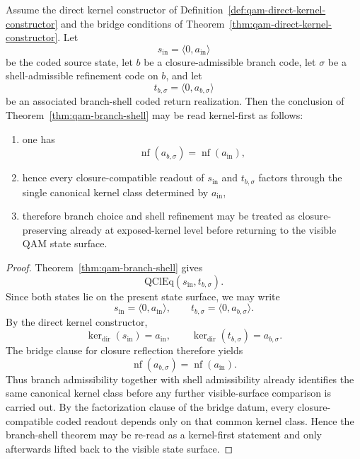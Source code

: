 \begin{proposition}\label{prop:qam-kernel-first-branch-shell}
Assume the direct kernel constructor of Definition~\ref{def:qam-direct-kernel-constructor} and the bridge conditions of Theorem~\ref{thm:qam-direct-kernel-constructor}. Let
\[
s_{\mathrm{in}}=\langle 0,a_{\mathrm{in}}\rangle
\]
be the coded source state, let $b$ be a closure-admissible branch code, let $\sigma$ be a shell-admissible refinement code on $b$, and let
\[
t_{b,\sigma}=\langle 0,a_{b,\sigma}\rangle
\]
be an associated branch-shell coded return realization. Then the conclusion of Theorem~\ref{thm:qam-branch-shell} may be read kernel-first as follows:
\begin{enumerate}
\item one has
\[
\operatorname{nf}(a_{b,\sigma})=\operatorname{nf}(a_{\mathrm{in}}),
\]
\item hence every closure-compatible readout of $s_{\mathrm{in}}$ and $t_{b,\sigma}$ factors through the single canonical kernel class determined by $a_{\mathrm{in}}$,
\item therefore branch choice and shell refinement may be treated as closure-preserving already at exposed-kernel level before returning to the visible QAM state surface.
\end{enumerate}
\end{proposition}

\begin{proof}
Theorem~\ref{thm:qam-branch-shell} gives
\[
\mathrm{QClEq}(s_{\mathrm{in}},t_{b,\sigma}).
\]
Since both states lie on the present state surface, we may write
\[
s_{\mathrm{in}}=\langle 0,a_{\mathrm{in}}\rangle,
\qquad
 t_{b,\sigma}=\langle 0,a_{b,\sigma}\rangle.
\]
By the direct kernel constructor,
\[
\operatorname{ker}_{\mathrm{dir}}(s_{\mathrm{in}})=a_{\mathrm{in}},
\qquad
\operatorname{ker}_{\mathrm{dir}}(t_{b,\sigma})=a_{b,\sigma}.
\]
The bridge clause for closure reflection therefore yields
\[
\operatorname{nf}(a_{b,\sigma})=\operatorname{nf}(a_{\mathrm{in}}).
\]
Thus branch admissibility together with shell admissibility already identifies the same canonical kernel class before any further visible-surface comparison is carried out. By the factorization clause of the bridge datum, every closure-compatible coded readout depends only on that common kernel class. Hence the branch-shell theorem may be re-read as a kernel-first statement and only afterwards lifted back to the visible state surface.
\end{proof}

